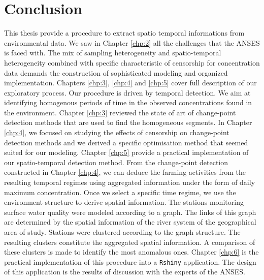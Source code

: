 

\chapter{Conclusion}

This thesis provide a procedure to extract spatio temporal informations from environmental data. 
We saw in Chapter \ref{chp:2} all the challenges that the ANSES is faced with. The mix of sampling heterogeneity and spatio-temporal heterogeneity combined with specific characteristic of censorship for concentration data demands the construction of sophisticated modeling and organized implementation. Chapters \ref{chp:3}, \ref{chp:4} and \ref{chp:5} cover full description of our exploratory process.     
Our procedure is driven by temporal detection. We aim at identifying homogenous periods of time in the observed concentrations found in the environment. Chapter \ref{chp:3} reviewed the state of art of change-point detection methods that are used to find the homogeneous segments. In Chapter \ref{chp:4}, we focused on studying the effects of censorship on change-point detection methods and we derived a specific optimisation method that seemed suited for our modeling. 
Chapter \ref{chp:5} provide a practical implementation of our spatio-temporal detection method. From the change-point detection constructed in Chapter \ref{chp:4}, we can deduce the farming activities from the resulting temporal regimes using aggregated information under the form of daily maximum concentration. Once we select a specific time regime, we use the environment structure to derive spatial information. The stations monitoring surface water quality were modeled according to a graph. The links of this graph are determined by the spatial information of the river system of the geographical area of study. Stations were clustered according to the graph structure. The resulting clusters constitute the aggregated spatial information. A comparison of these clusters is made to identify the most anomalous ones. 
Chapter \ref{chp:6} is the practical implementation of this procedure into a \texttt{Rshiny} application. The design of this application is the results of discussion with the experts of the ANSES.  

